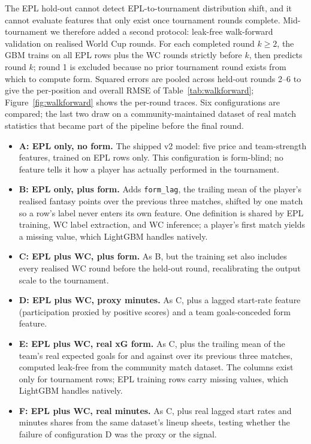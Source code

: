 The EPL hold-out cannot detect EPL-to-tournament distribution shift,
and it cannot evaluate features that only exist once tournament
rounds complete. Mid-tournament we therefore added a second protocol:
leak-free walk-forward validation on realised World Cup rounds. For
each completed round $k \ge 2$, the GBM trains on all EPL rows plus
the WC rounds strictly before $k$, then predicts round $k$; round 1
is excluded because no prior tournament round exists from which to
compute form. Squared errors are pooled across held-out rounds 2--6
to give the per-position and overall RMSE of
Table~\ref{tab:walkforward}; Figure~\ref{fig:walkforward} shows the
per-round traces. Six configurations are compared; the last two draw
on a community-maintained dataset of real match statistics
\citep{mominul2026dataset} that became part of the pipeline before
the final round.

\begin{itemize}
\item \textbf{A: EPL only, no form.} The shipped v2 model: five price
  and team-strength features, trained on EPL rows only. This
  configuration is form-blind; no feature tells it how a player has
  actually performed in the tournament.
\item \textbf{B: EPL only, plus form.} Adds \texttt{form\_lag}, the
  trailing mean of the player's realised fantasy points over the
  previous three matches, shifted by one match so a row's label never
  enters its own feature. One definition is shared by EPL training,
  WC label extraction, and WC inference; a player's first match
  yields a missing value, which LightGBM handles natively.
\item \textbf{C: EPL plus WC, plus form.} As B, but the training set
  also includes every realised WC round before the held-out round,
  recalibrating the output scale to the tournament.
\item \textbf{D: EPL plus WC, proxy minutes.} As C, plus a lagged
  start-rate feature (participation proxied by positive scores) and a
  team goals-conceded form feature.
\item \textbf{E: EPL plus WC, real xG form.} As C, plus the trailing
  mean of the team's real expected goals for and against over its
  previous three matches, computed leak-free from the community match
  dataset. The columns exist only for tournament rows; EPL training
  rows carry missing values, which LightGBM handles natively.
\item \textbf{F: EPL plus WC, real minutes.} As C, plus real lagged
  start rates and minutes shares from the same dataset's lineup
  sheets, testing whether the failure of configuration D was the
  proxy or the signal.
\end{itemize}

